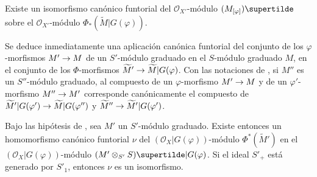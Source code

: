 \documentclass[oneside,10pt]{amsart}
\makeatletter
\newcommand{\ega@arrow}[2]{\mathchoice{#1}{#2}{#2}{#2}}
\renewcommand{\to}{\ega@arrow{\longrightarrow}{\rightarrow}}
\let\EGAOriginalLabel\label
\renewcommand{\label}[1]{\phantomsection\EGAOriginalLabel{#1}}
\makeatother
\begin{document}
\begin{proposition}[2.8.7]
\label{II.2.8.7-fr}
Existe un isomorfismo canónico funtorial del $\mathcal{O}_{X'}$-módulo $(M_{[\varphi]})\supertilde$ sobre el $\mathcal{O}_{X'}$-módulo $\Phi_*(\widetilde{M}|G(\varphi))$.
\end{proposition}

Se deduce inmediatamente una aplicación canónica funtorial del conjunto de los $\varphi$-morfismos $M'\to M$ de un $S'$-módulo graduado en el $S$-módulo graduado $M$, en el conjunto de los $\Phi$-morfismos $\widetilde{M}'\to\widetilde{M}|G(\varphi)$.
Con las notaciones de , si $M''$ es un $S''$-módulo graduado, al compuesto de un $\varphi$-morfismo $M'\to M$ y de un $\varphi'$-morfismo $M''\to M'$ corresponde canónicamente el compuesto de $\widetilde{M}'|G(\varphi')\to\widetilde{M}|G(\varphi'')$ y $\widetilde{M}''\to\widetilde{M}'|G(\varphi')$.

\begin{proposition}[2.8.8]
\label{II.2.8.8-fr}
Bajo las hipótesis de , sea $M'$ un $S'$-módulo graduado.
Existe entonces un homomorfismo canónico funtorial $\nu$ del $(\mathcal{O}_X|G(\varphi))$-módulo $\Phi^*(\widetilde{M}')$ en el $(\mathcal{O}_X|G(\varphi))$-módulo $(M'\otimes_{S'}S)\supertilde|G(\varphi)$.
Si el ideal $S'_+$ está generado por $S'_1$, entonces $\nu$ es un isomorfismo.
\end{proposition}
\end{document}
